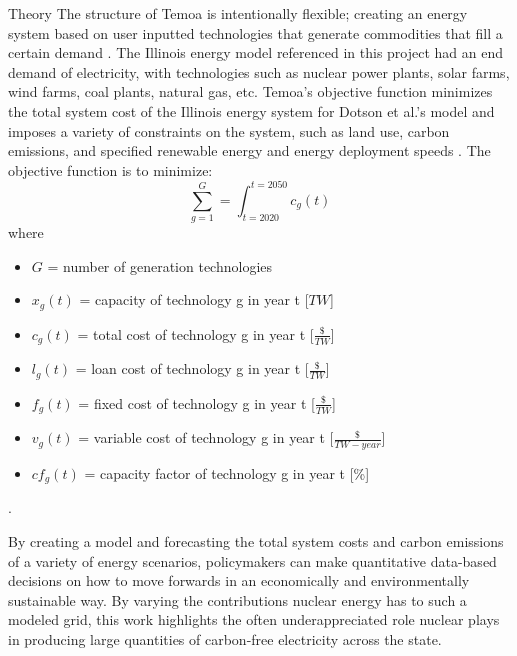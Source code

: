 \documentclass[final]{beamer}
\newlength{\onecolwid}
\newlength{\threecolwid}
\begin{document}
\begin{frame}[t]
\begin{columns}[t,totalwidth=\threecolwid]
\begin{column}{\onecolwid}
\begin{block}{Theory}
The structure of Temoa is intentionally flexible; creating an energy system based on user inputted technologies that generate commodities that fill a certain demand \cite{decarolis}. The Illinois energy model referenced in this project had an end demand of electricity, with technologies such as nuclear power plants, solar farms, wind farms, coal plants, natural gas, etc. Temoa’s objective function minimizes the total system cost of the Illinois energy system for Dotson et al.’s model and imposes a variety of constraints on the system, such as land use, carbon emissions, and specified renewable energy and energy deployment speeds \cite{dotson}. The objective function is to minimize:
	\begin{equation} \label{eq:objective}
	  \sum_{g=1}^{G} = \int_{t=2020}^{t=2050}c_g(t)
	\end{equation} where \newline
	\begin{itemize}
	  \item $G$ = number of generation technologies
	  \item $x_g(t)$ = capacity of technology g in year t [$TW$]
	  \item $c_g(t)$ = total cost of technology g in year t [$\frac{\$}{TW}$]
	  \item $l_g(t)$ = loan cost of technology g in year t [$\frac{\$}{TW}$]
	  \item $f_g(t)$ = fixed cost of technology g in year t [$\frac{\$}{TW}$]
	  \item $v_g(t)$ = variable cost of technology g in year t [$\frac{\$}{TW-year}$]
	  \item $cf_g(t)$ = capacity factor of technology g in year t [\%]
	\end{itemize} \cite{dotson}.
	
	By creating a model and forecasting the total system costs and carbon emissions of a variety of energy scenarios, policymakers can make quantitative data-based decisions on how to move forwards in an economically and environmentally sustainable way. By varying the contributions nuclear energy has to such a modeled grid, this work highlights the often underappreciated role nuclear plays in producing large quantities of carbon-free electricity across the state.



\end{block}
\end{column}
\end{columns}
\end{frame}
\end{document}
